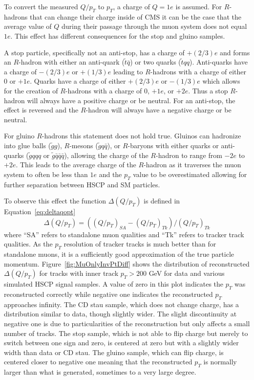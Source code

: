 To convert the measured $Q/p_T$ to $p_T$, a charge of $Q=1e$ is assumed.
For $R$-hadrons that can change their charge inside of CMS it can be the case that the average value of $Q$ during their passage through the muon system does not equal $1e$.
This effect has different consequences for the stop and gluino samples.

A stop particle, specifically not an anti-stop, has a charge of $+(2/3)e$ and forms an $R$-hadron with either an anti-quark ($\tilde{t} \bar{q}$) or
two quarks  ($\tilde{t} q q$). Anti-quarks have a charge of $-(2/3)e$ or $+(1/3)e$ leading to $R$-hadrons with a charge
of either 0 or $+1e$. Quarks have a charge of either $+(2/3)e$ or $-(1/3)e$ which allows for
the creation of $R$-hadrons with a charge of 0, $+1e$, or $+2e$. Thus a stop $R$-hadron will always have a
positive charge or be neutral. For an anti-stop, the effect is reversed and the $R$-hadron will always have a
negative charge or be neutral.

For gluino $R$-hadrons this statement does not hold true. Gluinos can hadronize into glue balls ($\tilde{g}g$), $R$-mesons ($\tilde{g} q \bar{q}$), or
$R$-baryons  with either quarks or anti-quarks ($\tilde{g} qqq$ or $\tilde{g} \bar{q}\bar{q}\bar{q}$),
allowing the charge of the $R$-hadron to range from $-2e$ to $+2e$. This leads to the
average charge of the $R$-hadron as it traverses the muon system to often be less than $1e$ and the $p_T$ value to be overestimated allowing for further separation
between HSCP and SM particles.

To observe this effect the function
$\Delta(Q/p_T)$ is defined in Equation~\ref{eq:deltaqopt}
\begin{equation}
\Delta(Q/p_T) = ((Q/p_T)_{SA} - (Q/p_T)_{Tk})/(Q/p_T)_{Tk}
\label{eq:deltaqopt}
\end{equation}
where ``SA'' refers to standalone muon qualities and ``Tk'' refers to
tracker track qualities. As the $p_T$ resolution of tracker tracks is much better than for standalone muons, it is a sufficiently good approximation
of the true particle momentum. Figure~\ref{fig:MuOnlyInvPtDiff} shows the distribution of
reconstructed $\Delta(Q/p_T)$ for tracks with inner track $p_T > 200$ GeV
for data and various simulated HSCP signal samples.
A value of zero in this plot indicates the $p_T$ was reconstructed correctly
while negative one indicates the reconstructed $p_T$ approaches infinity.
The CD stau sample, which does not change charge,
has a distribution similar to data, though slightly wider.
The slight discontinuity at negative one is due to particularities of the reconstruction but only affects a small number of tracks.
The stop sample, which is not able to flip charge but merely to switch
between one sign and zero, is centered at zero but with a slightly wider
width than data or CD stau.
The gluino sample, which can flip charge, is centered closer to negative one meaning that
the reconstructed $p_T$ is normally larger than what is generated, sometimes
to a very large degree. 

